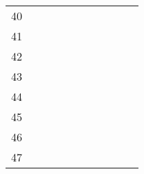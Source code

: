 \begin{table}[p]
\begin{center}
\begin{tabular}{|l||*{9}{p{11mm}|}p{18mm}|}
40   &     &     &     &     &     &     &     &     &     &     \\ \cline{1-10}
41   &     &     &     &     &     &     &     &     &     &     \\ \cline{1-10}
42   &     &     &     &     &     &     &     &     &     &     \\ \cline{1-10}
43   &     &     &     &     &     &     &     &     &     &     \\ \cline{1-10}
44   &     &     &     &     &     &     &     &     &     &     \\ \cline{1-10}
45   &     &     &     &     &     &     &     &     &     &     \\ \cline{1-10}
46   &     &     &     &     &     &     &     &     &     &     \\ \cline{1-10}
47   &     &     &     &     &     &     &     &     &     &     \\ \hline
\end{tabular}
\end{center}
\end{table}
